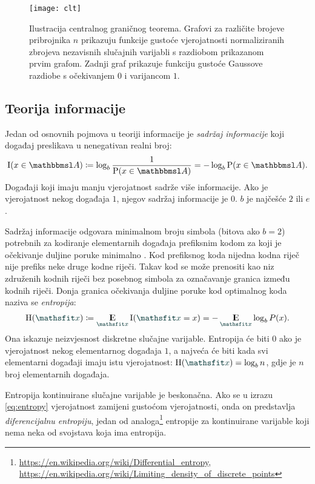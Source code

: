 \documentclass[utf8, diplomski, lmodern]{fer}
\begin{document}
\begin{figure}
	\centering
	\texttt{[image: clt]}
	\caption{Ilustracija centralnog graničnog teorema. Grafovi za različite brojeve pribrojnika $n$ prikazuju funkcije gustoće vjerojatnosti normaliziranih zbrojeva nezavisnih slučajnih varijabli s razdiobom prikazanom prvim grafom. Zadnji graf prikazuje funkciju gustoće Gaussove razdiobe s očekivanjem $0$ i varijancom $1$.}
	\label{fig:clt}
\end{figure}

\subsection{Teorija informacije}

Jedan od osnovnih pojmova u teoriji informacije je \emph{sadržaj informacije} koji događaj preslikava u nenegativan realni broj:
\begin{align}
\I(x\in\set A)\coloneqq\log_b \frac{1}{\P(x\in\set A)} = -\log_b \P(x\in\set A).
\end{align}
Događaji koji imaju manju vjerojatnost sadrže više informacije. Ako je vjerojatnost nekog događaja $1$, njegov sadržaj informacije je $0$. $b$ je najčešće $2$ ili $e$.

Sadržaj informacije odgovara minimalnom broju simbola (bitova ako $b=2$) potrebnih za kodiranje elementarnih događaja prefiksnim kodom za koji je očekivanje duljine poruke minimalno \citep{Olah:2015:VIT}. Kod prefiksnog koda nijedna kodna riječ nije prefiks neke druge kodne riječi. Takav kod se može prenositi kao niz združenih kodnih riječi bez posebnog simbola za označavanje granica između kodnih riječi. Donja granica očekivanja duljine poruke kod optimalnog koda naziva se \emph{entropija}:
\begin{align}\label{eq:entropy}
\H(\rvar x) \coloneqq  \E_{\rvar x}\I(\rvar x=x) = -\E_{\rvar x}\log_b P(x).
\end{align}
Ona iskazuje neizvjesnost diskretne slučajne varijable. Entropija će biti $0$ ako je vjerojatnost nekog elementarnog događaja $1$, a najveća će biti kada svi elementarni događaji imaju istu vjerojatnost: $\H(\rvar x)=\log_b n$, gdje je $n$ broj elementarnih događaja. 

Entropija kontinuirane slučajne varijable je beskonačna. Ako se u izrazu \eqref{eq:entropy} vjerojatnost zamijeni gustoćom vjerojatnosti, onda on predstavlja \emph{diferencijalnu entropiju}, jedan od analoga\footnote{\url{https://en.wikipedia.org/wiki/Differential_entropy}, \url{https://en.wikipedia.org/wiki/Limiting_density_of_discrete_points}} entropije za kontinuirane varijable koji nema neka od svojstava koja ima entropija.
\end{document}
